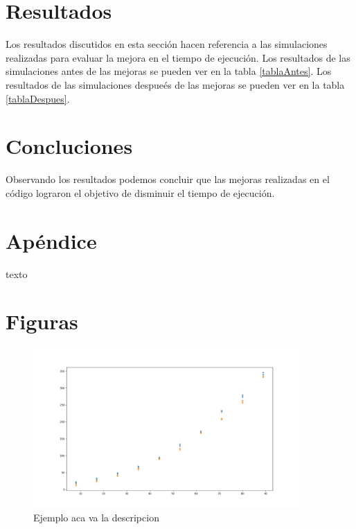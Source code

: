 \documentclass{article}
\begin{document}
\section{Resultados}
Los resultados discutidos en esta sección hacen referencia a las simulaciones realizadas para evaluar la mejora en el tiempo de ejecución.
Los resultados de las simulaciones antes de las mejoras se pueden ver en la tabla \ref{tablaAntes}.
Los resultados de las simulaciones despue\'es de las mejoras se pueden ver en la tabla \ref{tablaDespues}.

\section{Concluciones}
Observando los resultados podemos concluir que las mejoras realizadas en el código lograron el objetivo de disminuir el tiempo de ejecución.

\section{Apéndice}
texto

\clearpage
\section{Figuras}
\begin{figure}[h]
\begin{center}
\includegraphics[width=4in]{./images/inputVsOutput.jpeg}
\caption{Ejemplo aca va la descripcion }
\label{grafico}
\end{center}
\end{figure}
\clearpage
\end{document}
